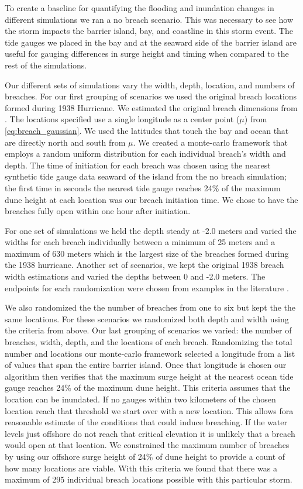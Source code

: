 \documentclass{coastal_paper}
\begin{document}
To create a baseline for quantifying the flooding and inundation changes in different simulations we ran a no breach scenario. This was necessary to see how the storm impacts the barrier island, bay, and coastline in this storm event. The tide gauges we placed in the bay and at the seaward side of the barrier island are useful for gauging differences in surge height and timing when compared to the rest of the simulations.

Our different sets of simulations vary the width, depth, location, and numbers of breaches. For our first grouping of scenarios we used the original breach locations formed during 1938 Hurricane. We estimated the original breach dimensions from \citet{Canizares2008}. The locations specified use a single longitude as a center point ($\mu$) from \ref{eq:breach_gaussian}. We used the latitudes that touch the bay and ocean that are directly north and south from $\mu$. We created a monte-carlo framework that employs a random uniform distribution for each individual breach's width and depth. The time of initiation for each breach was chosen using the nearest synthetic tide gauge data seaward of the island from the no breach simulation; the first time in seconds the nearest tide gauge reaches 24\% of the maximum dune height at each location was our breach initiation time. We chose to have the breaches fully open within one hour after initiation.

For one set of simulations we held the depth steady at -2.0 meters and varied the widths for each breach individually between a minimum of 25 meters and a maximum of 630 meters which is the largest size of the breaches formed during the 1938 hurricane. Another set of scenarios, we kept the original 1938 breach width estimations and varied the depths between 0 and -2.0 meters. The endpoints for each randomization were chosen from examples in the literature \citep{Schmeltz1983Breach/InletInlet., Kraus2003a,Visser1999, Canizares2008}. 

We also randomized the the number of breaches from one to six but kept the the same locations. For these scenarios we randomized both depth and width using the criteria from above. Our last grouping of scenarios we varied: the number of breaches, width, depth, and the locations of each breach. Randomizing the total number and locations our monte-carlo framework selected a longitude from a list of values that span the entire barrier island. Once that longitude is chosen our algorithm then verifies that the maximum surge height at the nearest ocean tide gauge reaches 24\% of the maximum dune height. This criteria assumes that the location can be inundated. If no gauges within two kilometers of the chosen location reach that threshold we start over with a new location. This allows fora  reasonable estimate of the conditions that could induce breaching. If the water levels just offshore do not reach that critical elevation it is unlikely that a breach would open at that location. We constrained the maximum number of breaches by using our offshore surge height of 24\% of dune height to provide a count of how many locations are viable. With this criteria we found that there was a maximum of 295 individual breach locations possible with this particular storm.
\end{document}
